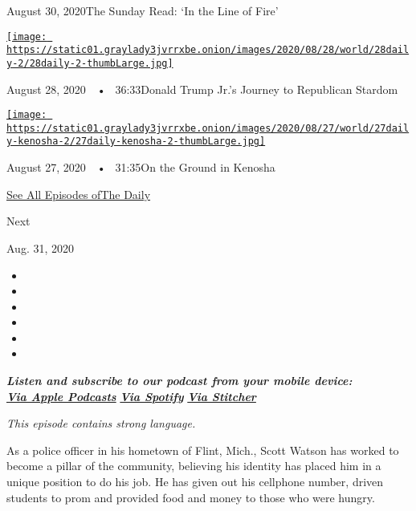 August 30, 2020The Sunday Read: `In the Line of Fire'

\href{https://www.nytimes3xbfgragh.onion/2020/08/28/podcasts/the-daily/donald-trump-junior-campaign.html?action=click\&module=audio-series-bar\&region=header\&pgtype=Article}{\texttt{[image: https://static01.graylady3jvrrxbe.onion/images/2020/08/28/world/28daily-2/28daily-2-thumbLarge.jpg]}}

August 28, 2020~~•~ 36:33Donald Trump Jr.'s Journey to Republican
Stardom

\href{https://www.nytimes3xbfgragh.onion/2020/08/27/podcasts/the-daily/kenosha-wisconsin-protests.html?action=click\&module=audio-series-bar\&region=header\&pgtype=Article}{\texttt{[image: https://static01.graylady3jvrrxbe.onion/images/2020/08/27/world/27daily-kenosha-2/27daily-kenosha-2-thumbLarge.jpg]}}

August 27, 2020~~•~ 31:35On the Ground in Kenosha

\href{https://www.nytimes3xbfgragh.onion/column/the-daily}{See All
Episodes ofThe Daily}

Next

Aug. 31, 2020

\begin{itemize}
\item
\item
\item
\item
\item
\item
\end{itemize}

\emph{\textbf{Listen and subscribe to our podcast from your mobile
device:}}\\
\textbf{\href{https://itunes.apple.com/us/podcast/the-daily/id1200361736?mt=2}{\emph{Via
Apple Podcasts}}} \emph{\textbf{\textbar{}}}
\textbf{\href{https://open.spotify.com/show/3IM0lmZxpFAY7CwMuv9H4g?si=SfuMSC55R1qprFsRZU3_zw}{\emph{Via
Spotify}}} \emph{\textbf{\textbar{}}}
\textbf{\href{http://www.stitcher.com/podcast/the-new-york-times/the-daily-10}{\emph{Via
Stitcher}}}

\emph{This episode contains strong language.}

As a police officer in his hometown of Flint, Mich., Scott Watson has
worked to become a pillar of the community, believing his identity has
placed him in a unique position to do his job. He has given out his
cellphone number, driven students to prom and provided food and money to
those who were hungry.

